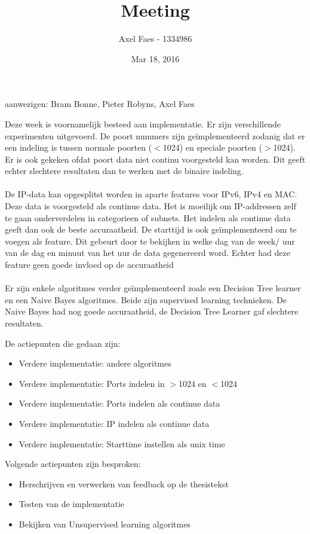 \documentclass[notitlepage]{article}
\title{Meeting}
\author{Axel Faes - 1334986}
\date{Mar 18, 2016}
\begin{document}
\maketitle

aanwezigen: Bram Bonne, Pieter Robyns, Axel Faes

Deze week is voornamelijk besteed aan implementatie. Er zijn verschillende experimenten uitgevoerd. De poort nummers zijn ge\"implementeerd zodanig dat er een indeling is tussen normale poorten ($<$1024) en speciale poorten ($>$1024). Er is ook gekeken ofdat poort data niet continu voorgesteld kan worden. Dit geeft echter slechtere resultaten dan te werken met de binaire indeling.\\\\
De IP-data kan opgesplitst worden in aparte features voor IPv6, IPv4 en MAC. Deze data is voorgesteld als continue data. Het is moeilijk om IP-addressen zelf te gaan onderverdelen in categorieen of subnets. Het indelen als continue data geeft dan ook de beste accuraatheid.  De starttijd is ook ge\"implementeerd om te voegen als feature. Dit gebeurt door te bekijken in welke dag van de week/ uur van de dag en minuut van het uur de data gegenereerd word. Echter had deze feature geen goede invloed op de accuraatheid\\
\\
Er zijn enkele algoritmes verder ge\"implementeerd zoals een Decision Tree learner en een Naive Bayes algoritmes. Beide zijn supervised learning technieken. De Naive Bayes had nog goede accuraatheid, de Decision Tree Learner gaf slechtere resultaten.

De actiepunten die gedaan zijn:
\begin{itemize}  
        \item Verdere implementatie: andere algoritmes
        \item Verdere implementatie: Ports indelen in $>$1024 en $<$1024
        \item Verdere implementatie: Ports indelen als continue data
        \item Verdere implementatie: IP indelen als continue data
        \item Verdere implementatie: Starttime instellen als unix time
\end{itemize}

Volgende actiepunten zijn besproken:
\begin{itemize}  		
		\item Herschrijven en verwerken van feedback op de thesistekst 
        \item Testen van de implementatie
        \item Bekijken van Unsupervised learning algoritmes
\end{itemize}
\end{document}
